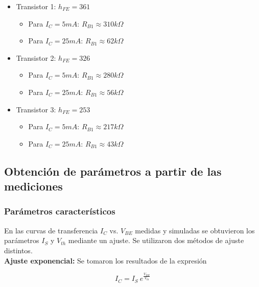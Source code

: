\documentclass[10pt,spanish,a4paper,openany,notitlepage]{article}
\begin{document}
\begin{itemize}

\item{Transistor 1:} $h_{FE} = 361$

\begin{itemize}
\item{Para $I_C = 5 \unit{mA}$}: $R_{B1} \approx 310 \unit{k\Omega}$
\item{Para $I_C = 25 \unit{mA}$}: $R_{B1} \approx  62\unit{k\Omega}$
\end{itemize}

\item{Transistor 2:} $h_{FE} = 326$

\begin{itemize}
\item{Para $I_C = 5 \unit{mA}$}: $R_{B1} \approx  280\unit{k\Omega}$
\item{Para $I_C = 25 \unit{mA}$}: $R_{B1} \approx  56\unit{k\Omega}$
\end{itemize}

\item{Transistor 3:} $h_{FE} = 253$

\begin{itemize}
\item{Para $I_C = 5 \unit{mA}$}: $R_{B1} \approx  217\unit{k\Omega}$
\item{Para $I_C = 25 \unit{mA}$}: $R_{B1} \approx  43\unit{k\Omega}$
\end{itemize}

\end{itemize}

\subsection{Obtención de parámetros a partir de las mediciones}

\subsubsection{Parámetros característicos}

En las curvas de transferencia $I_C$ vs. $V_{BE}$ medidas y simuladas se 
obtuvieron los parámetros $I_S$ y $V_{th}$ mediante un ajuste. Se utilizaron 
dos métodos de ajuste distintos.\\

\textbf{Ajuste exponencial:} Se tomaron los resultados de la expresión

\[ \displaystyle I_C  = I_S\ e^{\frac{V_{BE}}{V_{th}}} \]
\end{document}
